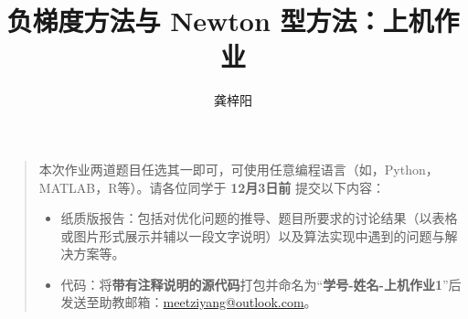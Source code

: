 \documentclass[cn,a4paper,12pt,founder,mtpro2]{elegantpaper}
\title{负梯度方法与 Newton 型方法：上机作业}
\author{龚梓阳}
\date{\zhtoday}
\begin{document}
\maketitle

\begin{quotation}
    本次作业两道题目任选其一即可，可使用任意编程语言（如，Python，MATLAB，R等）。请各位同学于 \textbf{12月3日前} 提交以下内容：
    \begin{itemize}
        \item 纸质版报告：包括对优化问题的推导、题目所要求的讨论结果（以表格或图片形式展示并辅以一段文字说明）以及算法实现中遇到的问题与解决方案等。
        \item 代码：将\textbf{带有注释说明的源代码}打包并命名为“\textbf{学号-姓名-上机作业1}”后发送至助教邮箱：\href{mailto:meetziyang@outlook.com}{meetziyang@outlook.com}。
    \end{itemize}
\end{quotation}
\end{document}
